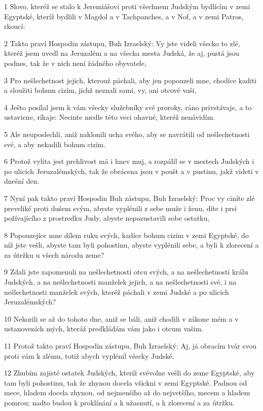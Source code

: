 \par 1 Slovo, kteréž se stalo k Jeremiášovi proti všechnem Judským bydlícím v zemi Egyptské, kteríž bydlili v Magdol a v Tachpanches, a v Nof, a v zemi Patros, rkoucí:
\par 2 Takto praví Hospodin zástupu, Buh Izraelský: Vy jste videli všecko to zlé, kteréž jsem uvedl na Jeruzalém a na všecka mesta Judská, že aj, pustá jsou podnes, tak že v nich není žádného obyvatele,
\par 3 Pro nešlechetnost jejich, kterouž páchali, aby jen popouzeli mne, chodíce kaditi a sloužiti bohum cizím, jichž neznali sami, vy, ani otcové vaši,
\par 4 Ješto posílal jsem k vám všecky služebníky své proroky, ráno privstávaje, a to ustavicne, ríkaje: Necinte medle této veci ohavné, kteréž nenávidím.
\par 5 Ale neuposlechli, aniž naklonili ucha svého, aby se navrátili od nešlechetnosti své, a aby nekadili bohum cizím.
\par 6 Protož vylita jest prchlivost má i hnev muj, a rozpálil se v mestech Judských i po ulicích Jeruzalémských, tak že obrácena jsou v poušt a v pustinu, jakž videti v dnešní den.
\par 7 Nyní pak takto praví Hospodin Buh zástupu, Buh Izraelský: Proc vy ciníte zlé preveliké proti dušem svým, abyste vyplénili z sebe muže i ženu, díte i prsí požívajícího z prostredku Judy, abyste nepozustavili sobe ostatku,
\par 8 Popouzejíce mne dílem ruku svých, kadíce bohum cizím v zemi Egyptské, do níž jste vešli, abyste tam byli pohostinu, abyste vyplénili sebe, a byli k zlorecení a za útržku u všech národu zeme?
\par 9 Zdali jste zapomenuli na nešlechetnosti otcu svých, a na nešlechetnosti králu Judských, a na nešlechetnosti manželek jejich, a na nešlechetnosti své, i na nešlechetnosti manželek svých, kteréž páchali v zemi Judské a po ulicích Jeruzalémských?
\par 10 Nekorili se až do tohoto dne, aniž se báli, aniž chodili v zákone mém a v ustanoveních mých, kteráž predkládám vám jako i otcum vašim.
\par 11 Protož takto praví Hospodin zástupu, Buh Izraelský: Aj, já obracím tvár svou proti vám k zlému, totiž abych vyplénil všecky Judské.
\par 12 Zhubím zajisté ostatek Judských, kteríž svévolne vešli do zeme Egyptské, aby tam byli pohostinu, tak že zhynou docela všickni v zemi Egyptské. Padnou od mece, hladem docela zhynou, od nejmenšího až do nejvetšího, mecem a hladem pomrou; nadto budou k proklínání a k užasnutí, a k zlorecení a za útržku.
